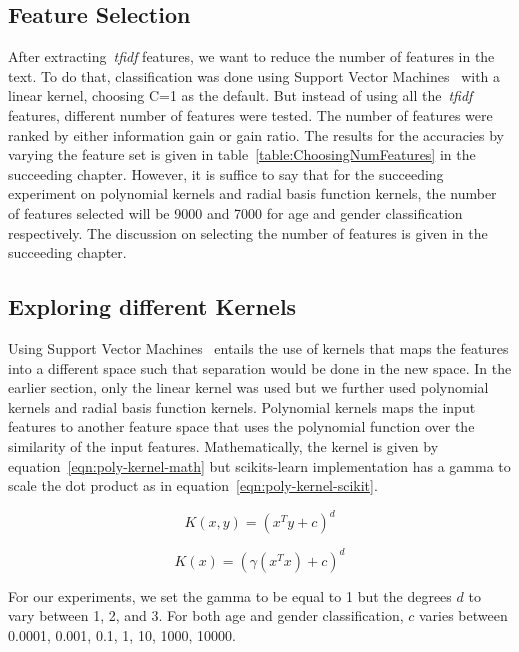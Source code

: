 \documentclass[a4paper]{llncs}
\begin{document}
\subsection{Feature Selection}
After extracting~\textit{tfidf} features, we want to reduce the number of features in the text. To do that, classification was done using Support Vector Machines~\cite{cortes1995support} with a linear kernel, choosing C=1 as the default. But instead of using all the~\textit{tfidf} features, different number of features were tested. The number of features were ranked by either information gain or gain ratio. The results for the accuracies by varying the feature set is given in table~\ref{table:ChoosingNumFeatures} in the succeeding chapter. However, it is suffice to say that for the succeeding experiment on polynomial kernels and radial basis function kernels, the number of features selected will be 9000 and 7000 for age and gender classification respectively. The discussion on selecting the number of features is given in the succeeding chapter. 



\subsection{Exploring different Kernels}
Using Support Vector Machines~\cite{cortes1995support} entails the use of kernels that maps the features into a different space such that separation would be done in the new space. In the earlier section, only the linear kernel was used but we further used polynomial kernels and radial basis function kernels. Polynomial kernels maps the input features to another feature space that uses the polynomial function over the similarity of the input features. Mathematically, the kernel is given by equation~\ref{eqn:poly-kernel-math} but scikits-learn implementation has a gamma to scale the dot product as in equation~\ref{eqn:poly-kernel-scikit}.

\begin{equation}
K(x,y) = (x^Ty + c)^d
\label{eqn:poly-kernel-math}
\end{equation}

\begin{equation}
K(x) = (\gamma(x^Tx)+c)^d
\label{eqn:poly-kernel-scikit}
\end{equation}

For our experiments, we set the gamma to be equal to 1 but the degrees $d$ to vary between 1, 2, and 3. For both age and gender classification, $c$ varies between 0.0001, 0.001, 0.1, 1, 10, 1000, 10000.   
\end{document}
